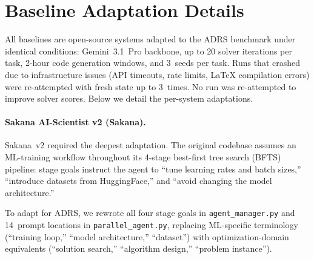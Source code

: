 
\section{Baseline Adaptation Details}
\label{app:baseline_adaptation}

All baselines are open-source systems adapted to the ADRS benchmark under identical conditions: Gemini~3.1~Pro backbone, up to 20 solver iterations per task, 2-hour code generation windows, and 3~seeds per task.
Runs that crashed due to infrastructure issues (API timeouts, rate limits, \LaTeX{} compilation errors) were re-attempted with fresh state up to 3~times. No run was re-attempted to improve solver scores.
Below we detail the per-system adaptations.

\paragraph{Sakana AI-Scientist v2 (Sakana).}
Sakana~v2 required the deepest adaptation.
The original codebase assumes an ML-training workflow throughout its 4-stage best-first tree search (BFTS) pipeline: stage goals instruct the agent to ``tune learning rates and batch sizes,'' ``introduce datasets from HuggingFace,'' and ``avoid changing the model architecture.''

To adapt for ADRS, we rewrote all four stage goals in \texttt{agent\_manager.py} and 14~prompt locations in \texttt{parallel\_agent.py}, replacing ML-specific terminology (``training loop,'' ``model architecture,'' ``dataset'') with optimization-domain equivalents (``solution search,'' ``algorithm design,'' ``problem instance'').

